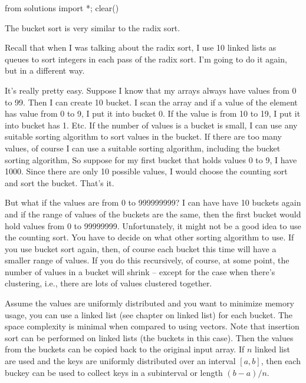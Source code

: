 \begin{python0}
from solutions import *; clear()
\end{python0}

The bucket sort is very similar to the radix sort.

Recall that when I was talking about the radix sort, I use
10 linked lists as queues to sort integers in each pass of the radix sort.
I'm going to do it again, but in a different way.

It's really pretty easy.
Suppose I know that my arrays always have values from 0 to 99.
Then I can create 10 bucket.
I scan the array and if a value of the element
has value from 0 to 9, I put it into bucket 0.
If the value is from 10 to 19, I put it into bucket has 1. 
Etc.
If the number of values is a bucket is small,
I can use any suitable sorting algorithm to sort values in the bucket.
If there are too many values, of course I can use a suitable 
sorting algorithm, including the bucket sorting algorithm,
So suppose for my first bucket that holds values 0 to 9, I have 1000.
Since there are only 10 possible values, I would choose the counting sort
and sort the bucket. 
That's it.

But what if the values are from 0 to 999999999?
I can have have 10 buckets again and if the 
range of values of the buckets are the same, then
the first bucket would hold values from 0 to 99999999.
Unfortunately, it might not be a good idea to use the counting sort.
You have to decide on what other sorting algorithm to use.
If you use bucket sort again, then, of course each bucket this
time will have a smaller range of values.
If you do this recursively, of course, at some point, the number of
values in a bucket will shrink -- except for the case when there's clustering,
i.e., there are lots of values clustered
together.

Assume the values are uniformly distributed
and you want to minimize memory usage, you can use a linked list (see chapter
on linked list) for each bucket.
The space complexity is minimal when compared to using vectors.
Note that insertion sort can be performed on linked lists (the buckets in
this case).
Then the values from the buckets can be copied back to the original input
array.
If $n$ linked list are used and the keys are uniformly distributed
over an interval $[a, b]$, then each buckey can be used to collect
keys in a subinterval or length $(b - a)/n$.


